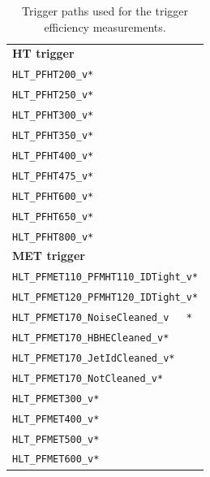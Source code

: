 \begin{table}[htb]
 \centering
 \caption{Trigger paths used for the trigger efficiency measurements.}
 \normalsize
 \label{tab:app_trigger2}
 \begin{tabular}[width=\textwidth]{l}
  \hline
  \normalsize{\textbf{HT trigger}}  \\
  \verb|HLT_PFHT200_v*|           \\
  \verb|HLT_PFHT250_v*|           \\
  \verb|HLT_PFHT300_v*|           \\
  \verb|HLT_PFHT350_v*|           \\
  \verb|HLT_PFHT400_v*|           \\
  \verb|HLT_PFHT475_v*|           \\
  \verb|HLT_PFHT600_v*|           \\
  \verb|HLT_PFHT650_v*|           \\
  \verb|HLT_PFHT800_v*|           \\
  \normalsize{\textbf{MET trigger}} \\
  \verb|HLT_PFMET110_PFMHT110_IDTight_v*|           \\
  \verb|HLT_PFMET120_PFMHT120_IDTight_v*|           \\
  \verb|HLT_PFMET170_NoiseCleaned_v   *|           \\
  \verb|HLT_PFMET170_HBHECleaned_v*|           \\
  \verb|HLT_PFMET170_JetIdCleaned_v*|           \\
  \verb|HLT_PFMET170_NotCleaned_v*|           \\
  \verb|HLT_PFMET300_v*|           \\
  \verb|HLT_PFMET400_v*|           \\
  \verb|HLT_PFMET500_v*|           \\
  \verb|HLT_PFMET600_v*|           \\
  \hline
 \end{tabular}
\end{table}

